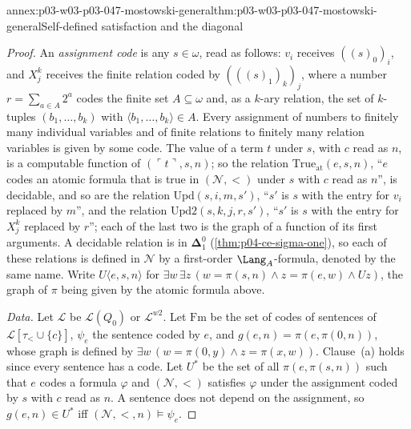 \begin{annexitem}{annex:p03-w03-p03-047-mostowski-general}{thm:p03-w03-p03-047-mostowski-general}{Self-defined satisfaction and the diagonal}
\begin{proof}
An \emph{assignment code} is any \(s\in\omega\), read as follows: \(v_i\)
receives \(((s)_0)_i\), and \(X^k_j\) receives the finite relation coded by
\((((s)_1)_k)_j\), where a number \(r=\sum_{a\in A}2^a\) codes the finite
set \(A\subseteq\omega\) and, as a \(k\)-ary relation, the set of
\(k\)-tuples \((b_1,\dots,b_k)\) with \(\langle b_1,\dots,b_k\rangle\in A\).
Every assignment of numbers to finitely many individual variables and of
finite relations to finitely many relation variables is given by some
code.  The value of a term \(t\) under \(s\), with \(c\) read as \(n\), is a
computable function of \((\ulcorner t\urcorner,s,n)\); so the relation
\(\mathrm{True}_{\mathrm{at}}(e,s,n)\), ``\(e\) codes an atomic formula that
is true in \((\mathcal N,<)\) under \(s\) with \(c\) read as \(n\)'', is
decidable, and so are the relation \(\mathrm{Upd}(s,i,m,s')\), ``\(s'\) is
\(s\) with the entry for \(v_i\) replaced by \(m\)'', and the relation
\(\mathrm{Upd2}(s,k,j,r,s')\), ``\(s'\) is \(s\) with the entry for
\(X^k_j\) replaced by \(r\)''; each of the last two is the graph of a
function of its first arguments.  A decidable relation is in
\(\boldsymbol\Delta^0_1\) (\cref{thm:p04-ce-sigma-one}), so each of these
relations is defined in \(\mathcal N\) by a first-order \(\Lang_A\)-formula,
denoted by the same name.  Write \(U\langle e,s,n\rangle\) for
\(\exists w\,\exists z\,(w=\pi(s,n)\land z=\pi(e,w)\land Uz)\), the graph
of \(\pi\) being given by the atomic formula above.

\emph{Data.}  Let \(\mathscr L\) be \(\mathscr L(Q_0)\) or
\(\mathscr L^{w2}\).  Let \(\mathrm{Fm}\) be the set of codes of sentences of
\(\mathscr L[\tau_<\cup\{c\}]\), \(\psi_e\) the sentence coded by \(e\), and
\(g(e,n)=\pi(e,\pi(0,n))\), whose graph is defined by
\(\exists w\,(w=\pi(0,y)\land z=\pi(x,w))\).  Clause~(a) holds since every
sentence has a code.  Let \(U^\ast\) be the set of all \(\pi(e,\pi(s,n))\)
such that \(e\) codes a formula \(\varphi\) and \((\mathcal N,<)\) satisfies
\(\varphi\) under the assignment coded by \(s\) with \(c\) read as \(n\).
A sentence does not depend on the assignment, so \(g(e,n)\in U^\ast\) iff
\((\mathcal N,<,n)\models\psi_e\).


\end{proof}
\end{annexitem}
